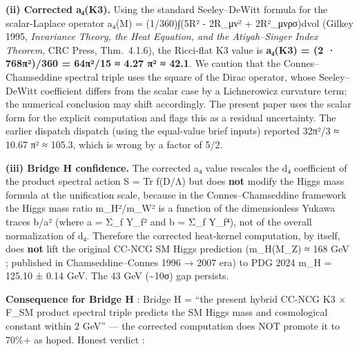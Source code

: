 \documentclass[
  11pt,
  a4paper,
]{article}
\begin{document}
\textbf{(ii) Corrected a₄(K3).} Using the standard Seeley--DeWitt formula for the scalar-Laplace operator a₄(M) = (1/360)∫(5R² - 2R\_μν² + 2R²\_μνρσ)dvol (Gilkey 1995, \emph{Invariance Theory, the Heat Equation, and the Atiyah--Singer Index Theorem}, CRC Press, Thm.~4.1.6), the Ricci-flat K3 value is \textbf{a₄(K3) = (2 · 768π²)/360 = 64π²/15 ≈ 4.27 π² ≈ 42.1}. We caution that the Connes--Chamseddine spectral triple uses the square of the Dirac operator, whose Seeley--DeWitt coefficient differs from the scalar case by a Lichnerowicz curvature term; the numerical conclusion may shift accordingly. The present paper uses the scalar form for the explicit computation and flags this as a residual uncertainty. The earlier dispatch dispatch (using the equal-value brief inputs) reported 32π²/3 ≈ 10.67 π² ≈ 105.3, which is wrong by a factor of 5/2.

\textbf{(iii) Bridge H confidence.} The corrected a₄ value rescales the d₄ coefficient of the product spectral action S = Tr f(D/Λ) but does \textbf{not} modify the Higgs mass formula at the unification scale, because in the Connes--Chamseddine framework the Higgs mass ratio m\_H²/m\_W² is a function of the dimensionless Yukawa traces b/a² (where a = Σ\_f Y\_f² and b = Σ\_f Y\_f⁴), not of the overall normalization of d₄. Therefore the corrected heat-kernel computation, by itself, does \textbf{not} lift the original CC-NCG SM Higgs prediction (m\_H(M\_Z) ≈ 168 GeV ; published in Chamseddine--Connes 1996 → 2007 era) to PDG 2024 m\_H = 125.10 ± 0.14 GeV. The 43 GeV (\textasciitilde10σ) gap persists.

\textbf{Consequence for Bridge H} : Bridge H = ``the present hybrid CC-NCG K3 × F\_SM product spectral triple predicts the SM Higgs mass and cosmological constant within 2 GeV'' --- the corrected computation does NOT promote it to 70\%+ as hoped. Honest verdict :
\end{document}
